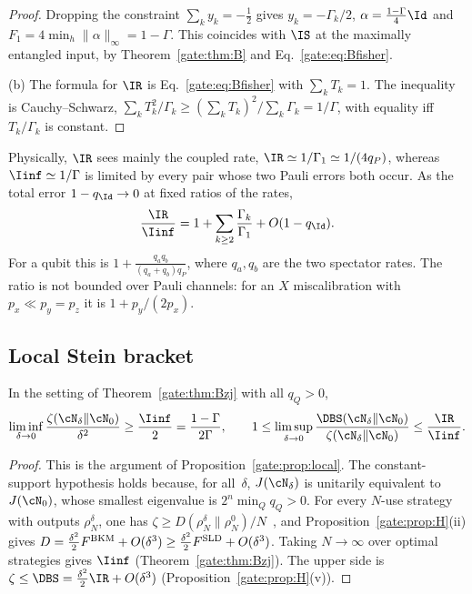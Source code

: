 \begin{proof}
Dropping the constraint $\sum_ky_k=-\frac12$ gives $y_k=-\Gamma_k/2$, $\alpha=\frac{1-\Gamma}4\Id$ and $F_1=4\min_h\|\alpha\|_\infty=1-\Gamma$. This coincides with $\IS$ at the maximally entangled input, by Theorem~\ref{gate:thm:B} and Eq.~\eqref{gate:eq:Bfisher}.

(b) The formula for $\IR$ is Eq.~\eqref{gate:eq:Bfisher} with $\sum_kT_k=1$. The inequality is Cauchy--Schwarz, $\sum_kT_k^2/\Gamma_k\ge(\sum_kT_k)^2/\sum_k\Gamma_k=1/\Gamma$, with equality iff $T_k/\Gamma_k$ is constant.
\end{proof}

Physically, $\IR$ sees mainly the coupled rate, $\IR\simeq1/\Gamma_1\simeq1/(4q_P)$, whereas $\Iinf\simeq1/\Gamma$ is limited by every pair whose two Pauli errors both occur. As the total error $1-q_\Id\to0$ at fixed ratios of the rates,
\begin{equation}\label{gate:eq:Bratio0}
\frac{\IR}{\Iinf}=1+\sum_{k\ge2}\frac{\Gamma_k}{\Gamma_1}+O(1-q_\Id).
\end{equation}
For a qubit this is $1+\frac{q_aq_b}{(q_a+q_b)q_P}$, where $q_a,q_b$ are the two spectator rates. The ratio is not bounded over Pauli channels: for an $X$ miscalibration with $p_x\ll p_y=p_z$ it is $1+p_y/(2p_x)$.

\subsection*{Local Stein bracket}

\begin{corollary}\label{gate:cor:Bstein}
In the setting of Theorem~\ref{gate:thm:Bzj} with all $q_Q>0$,
\begin{equation}\label{gate:eq:Bbracket}
\liminf_{\delta\to0}\frac{\zeta(\cN_\delta\|\cN_0)}{\delta^2}\ge\frac{\Iinf}2=\frac{1-\Gamma}{2\Gamma},\qquad 1\le\limsup_{\delta\to0}\frac{\DBS(\cN_\delta\|\cN_0)}{\zeta(\cN_\delta\|\cN_0)}\le\frac{\IR}{\Iinf}.
\end{equation}
\end{corollary}

\begin{proof}
This is the argument of Proposition~\ref{gate:prop:local}. The constant-support hypothesis holds because, for all~$\delta$, $J(\cN_\delta)$ is unitarily equivalent to $J(\cN_0)$, whose smallest eigenvalue is $2^n\min_Qq_Q>0$. For every $N$-use strategy with outputs $\rho_N^\delta$, one has $\zeta\ge D(\rho_N^\delta\|\rho_N^0)/N$~\cite{WangWilde2019,FFRS2020}, and Proposition~\ref{gate:prop:H}(ii) gives $D=\frac{\delta^2}{2}F^{\rm BKM}+O(\delta^3)\ge\frac{\delta^2}{2}F^{\rm SLD}+O(\delta^3)$. Taking $N\to\infty$ over optimal strategies gives $\Iinf$ (Theorem~\ref{gate:thm:Bzj}). The upper side is $\zeta\le\DBS=\frac{\delta^2}2\IR+O(\delta^3)$ (Proposition~\ref{gate:prop:H}(v)).
\end{proof}

